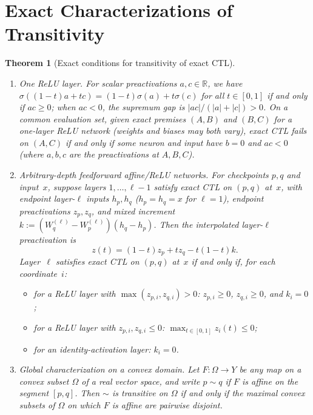 \documentclass[11pt]{article}
\theoremstyle{plain}
\newtheorem{theorem}{Theorem}
\theoremstyle{definition}
\theoremstyle{remark}
\begin{document}
\section{Exact Characterizations of Transitivity}

\begin{theorem}[Exact conditions for transitivity of exact CTL]\label{thm:char}
\leavevmode
\begin{enumerate}[label=\textup{(\arabic*)}]
\item \emph{One ReLU layer.} For scalar preactivations $a, c \in \mathbb{R}$, we have $\sigma((1 - t)a + tc) = (1 - t)\sigma(a) + t\sigma(c)$ for all $t \in [0, 1]$ if and only if $ac \ge 0$; when $ac < 0$, the supremum gap is $|ac|/(|a| + |c|) > 0$. On a common evaluation set, given exact premises $(A, B)$ and $(B, C)$ for a one-layer ReLU network (weights and biases may both vary), exact CTL fails on $(A, C)$ if and only if some neuron and input have $b = 0$ and $ac < 0$ (where $a, b, c$ are the preactivations at $A, B, C$).
\item \emph{Arbitrary-depth feedforward affine/ReLU networks.} For checkpoints $p, q$ and input~$x$, suppose layers $1, \dots, \ell - 1$ satisfy exact CTL on $(p, q)$ at~$x$, with endpoint layer-$\ell$ inputs $h_p, h_q$ ($h_p = h_q = x$ for $\ell = 1$), endpoint preactivations $z_p, z_q$, and mixed increment $k := (W_q^{(\ell)} - W_p^{(\ell)})(h_q - h_p)$. Then the interpolated layer-$\ell$ preactivation is
\begin{equation}\label{eq:quad-preact}
z(t) = (1 - t)z_p + t z_q - t(1 - t)k.
\end{equation}
Layer~$\ell$ satisfies exact CTL on $(p, q)$ at~$x$ if and only if, for each coordinate~$i$:
\begin{itemize}[nosep]
\item for a ReLU layer with $\max(z_{p,i}, z_{q,i}) > 0$: $z_{p,i} \ge 0$, $z_{q,i} \ge 0$, and $k_i = 0$;
\item for a ReLU layer with $z_{p,i}, z_{q,i} \le 0$: $\max_{t \in [0, 1]} z_i(t) \le 0$;
\item for an identity-activation layer: $k_i = 0$.
\end{itemize}
\item \emph{Global characterization on a convex domain.} Let $F : \Omega \to Y$ be any map on a convex subset $\Omega$ of a real vector space, and write $p \sim q$ if $F$ is affine on the segment $[p, q]$. Then $\sim$ is transitive on $\Omega$ if and only if the maximal convex subsets of $\Omega$ on which $F$ is affine are pairwise disjoint.
\end{enumerate}
\end{theorem}
\end{document}
